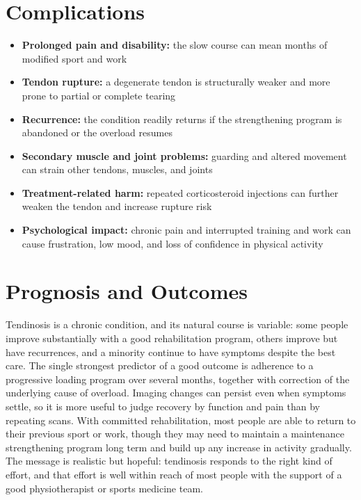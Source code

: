 \section*{Complications}
\begin{itemize}
    \item \textbf{Prolonged pain and disability:} the slow course can mean months of modified sport and work
    \item \textbf{Tendon rupture:} a degenerate tendon is structurally weaker and more prone to partial or complete tearing
    \item \textbf{Recurrence:} the condition readily returns if the strengthening program is abandoned or the overload resumes
    \item \textbf{Secondary muscle and joint problems:} guarding and altered movement can strain other tendons, muscles, and joints
    \item \textbf{Treatment-related harm:} repeated corticosteroid injections can further weaken the tendon and increase rupture risk
    \item \textbf{Psychological impact:} chronic pain and interrupted training and work can cause frustration, low mood, and loss of confidence in physical activity
\end{itemize}

\section*{Prognosis and Outcomes}
Tendinosis is a chronic condition, and its natural course is variable: some people improve substantially with a good rehabilitation program, others improve but have recurrences, and a minority continue to have symptoms despite the best care. The single strongest predictor of a good outcome is adherence to a progressive loading program over several months, together with correction of the underlying cause of overload. Imaging changes can persist even when symptoms settle, so it is more useful to judge recovery by function and pain than by repeating scans. With committed rehabilitation, most people are able to return to their previous sport or work, though they may need to maintain a maintenance strengthening program long term and build up any increase in activity gradually. The message is realistic but hopeful: tendinosis responds to the right kind of effort, and that effort is well within reach of most people with the support of a good physiotherapist or sports medicine team.

